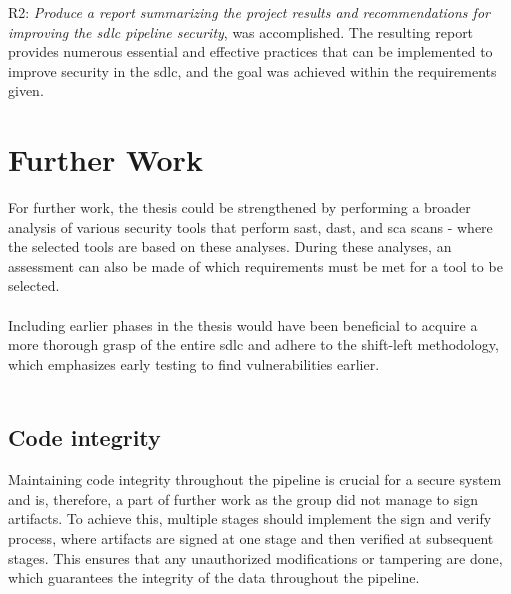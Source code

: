 R2: \textit{Produce a report summarizing the project results and recommendations for improving the \acrshort{sdlc} \gls{pipeline} security}, was accomplished. The resulting report provides numerous essential and effective practices that can be implemented to improve security in the \acrshort{sdlc}, and the goal was achieved within the requirements given. 

\section{Further Work}
For further work, the thesis could be strengthened by performing a broader analysis of various security tools that perform \acrshort{sast}, \acrshort{dast}, and \acrshort{sca} scans -  where the selected tools are based on these analyses. During these analyses, an assessment can also be made of which requirements must be met for a tool to be selected. 
\\~\\
Including earlier phases in the thesis would have been beneficial to acquire a more thorough grasp of the entire \acrlong{sdlc} and adhere to the shift-left methodology, which emphasizes early testing to find vulnerabilities earlier.   
\\~\\

\subsection{Code integrity}
Maintaining code integrity throughout the pipeline is crucial for a secure system and is, therefore, a part of further work as the group did not manage to sign artifacts. To achieve this, multiple stages should implement the sign and verify process, where artifacts are signed at one stage and then verified at subsequent stages. This ensures that any unauthorized modifications or tampering are done, which guarantees the integrity of the data throughout the pipeline.  


